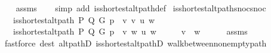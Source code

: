 \begin{isabellebody}
\endisataginvisible
{\isafoldinvisible}%
%
\isadeliminvisible
\isanewline
%
\endisadeliminvisible
%
\isadelimproof
\ \ %
\endisadelimproof
%
\isatagproof
{}\isamarkupfalse%
\ assms\isanewline
\ \ \isamarkupfalse%
\ {\isacharparenleft}{\kern0pt}simp\ add{\isacharcolon}{\kern0pt}\ is{\isacharunderscore}{\kern0pt}shortest{\isacharunderscore}{\kern0pt}alt{\isacharunderscore}{\kern0pt}path{\isacharunderscore}{\kern0pt}def{\isacharparenright}{\kern0pt}{\isacharplus}{\kern0pt}%
\endisatagproof
{\isafoldproof}%
%
\isadelimproof
\isanewline
%
\endisadelimproof
%
\isadeliminvisible
\isanewline
%
\endisadeliminvisible
%
\isataginvisible
{}\isamarkupfalse%
\ is{\isacharunderscore}{\kern0pt}shortest{\isacharunderscore}{\kern0pt}alt{\isacharunderscore}{\kern0pt}path{\isacharunderscore}{\kern0pt}snoc{\isacharunderscore}{\kern0pt}snoc{\isacharcolon}{\kern0pt}\isanewline
\ \ \ {\isachardoublequoteopen}is{\isacharunderscore}{\kern0pt}shortest{\isacharunderscore}{\kern0pt}alt{\isacharunderscore}{\kern0pt}path\ P\ Q\ G\ {\isacharparenleft}{\kern0pt}p\ {\isacharat}{\kern0pt}\ {\isacharbrackleft}{\kern0pt}v{\isacharcomma}{\kern0pt}\ v{\isacharprime}{\kern0pt}{\isacharbrackright}{\kern0pt}{\isacharparenright}{\kern0pt}\ u\ w{\isachardoublequoteclose}\isanewline
\ \ \ {\isachardoublequoteopen}is{\isacharunderscore}{\kern0pt}shortest{\isacharunderscore}{\kern0pt}alt{\isacharunderscore}{\kern0pt}path\ P\ Q\ G\ {\isacharparenleft}{\kern0pt}p\ {\isacharat}{\kern0pt}\ {\isacharbrackleft}{\kern0pt}v{\isacharcomma}{\kern0pt}\ w{\isacharbrackright}{\kern0pt}{\isacharparenright}{\kern0pt}\ u\ w{\isachardoublequoteclose}%
\endisataginvisible
{\isafoldinvisible}%
%
\isadeliminvisible
\isanewline
%
\endisadeliminvisible
%
\isadelimproof
%
\endisadelimproof
%
\isatagproof
{}\isamarkupfalse%
\ {\isacharminus}{\kern0pt}\isanewline
\ \ \isamarkupfalse%
\ {\isachardoublequoteopen}v{\isacharprime}{\kern0pt}\ {\isacharequal}{\kern0pt}\ w{\isachardoublequoteclose}\isanewline
\ \ \ \ \isamarkupfalse%
\ assms\isanewline
\ \ \ \ \isamarkupfalse%
\ {\isacharparenleft}{\kern0pt}fastforce\ dest{\isacharcolon}{\kern0pt}\ alt{\isacharunderscore}{\kern0pt}pathD{\isacharparenleft}{\kern0pt}{}{\isacharparenright}{\kern0pt}\ is{\isacharunderscore}{\kern0pt}shortest{\isacharunderscore}{\kern0pt}alt{\isacharunderscore}{\kern0pt}pathD{\isacharparenleft}{\kern0pt}{}{\isacharparenright}{\kern0pt}\ walk{\isacharunderscore}{\kern0pt}between{\isacharunderscore}{\kern0pt}nonempty{\isacharunderscore}{\kern0pt}path{\isacharparenleft}{\kern0pt}{}{\isacharparenright}{\kern0pt}{\isacharparenright}{\kern0pt}\isanewline

\end{isabellebody}

